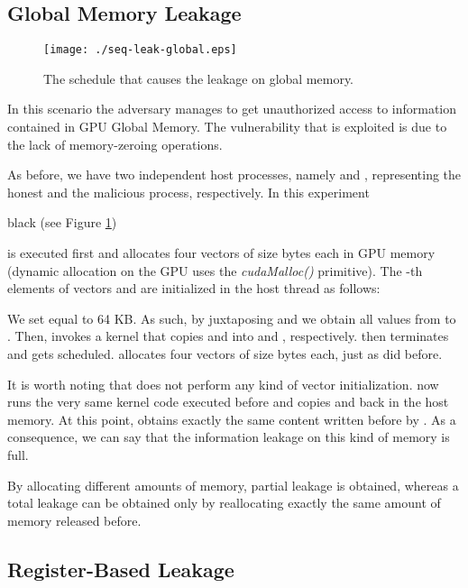 \documentclass[11pt,onecolumn,letterpaper]{IEEEtran}
\newcommand{\clr}{black}
\begin{document}
\subsection{Global Memory Leakage}
\label{sub:glbmem_attack}
	\begin{figure}[t]
		\begin{center}

		\texttt{[image: ./seq-leak-global.eps]}
		\caption{The schedule that causes the leakage on global memory. }
		\label{fig:glbmem_attack}
	\end{center}
\end{figure}

In this scenario the adversary manages to get unauthorized access to information contained in GPU Global Memory.
The vulnerability that is exploited is due to the lack of memory-zeroing operations. 

As before, we have two independent host processes, namely  and , representing the honest and the malicious process, respectively.
In this experiment \begin{color}{\clr}
(see Figure \ref{fig:glbmem_attack})
\end{color}
  is executed first and allocates four vectors  of size  bytes each in GPU memory
(dynamic allocation on the GPU uses the \emph{cudaMalloc()} primitive).
The -th elements of vectors  and  are initialized in the host thread as follows:



We set  equal to 64 KB.
As such, by juxtaposing  and  we obtain all values from  to .
Then,  invokes a kernel that copies  and  into  and , respectively.
 then terminates and  gets scheduled.
 allocates four vectors  of size  bytes each, just as  did before.

It is worth noting that  does not perform any kind of vector initialization.
 now runs the very same kernel code  executed before and copies  and  back in the host memory.
At this point, 
 obtains exactly the same content written before by .
As a consequence, we can say that the information leakage on this kind of memory is full.

By allocating different amounts of memory, partial leakage is obtained,
whereas a total leakage can be obtained only by reallocating exactly the same amount of memory released before.

\subsection{Register-Based Leakage}
\label{sub:regmem_attack}
\end{document}

